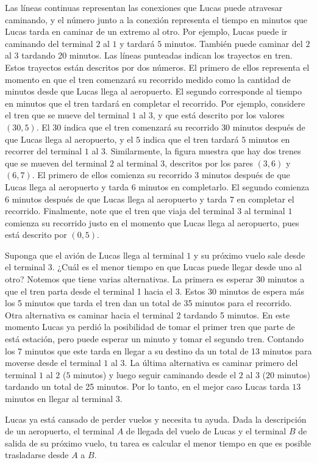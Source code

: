 \documentclass{oci}
\begin{document}
\begin{problemDescription}
  Las líneas continuas representan las conexiones que Lucas puede atravesar
  caminando, y el número junto a la conexión representa el tiempo en minutos que Lucas tarda
  en caminar de un extremo al otro. Por ejemplo, Lucas puede ir caminando del terminal $2$ al $1$
  y tardará $5$ minutos. También puede caminar del $2$ al $3$ tardando 20 minutos.
  Las líneas punteadas indican los trayectos en tren.
  Estos trayectos están descritos por dos números. El primero de ellos
  representa el momento en que el tren comenzará su recorrido 
  medido como la cantidad de minutos desde que Lucas llega al aeropuerto.
  El segundo corresponde al tiempo en minutos que el tren tardará en
  completar el recorrido.
  Por ejemplo, considere el tren que se mueve del terminal $1$ al $3$, y que está
  descrito por los valores $(30, 5)$. El $30$ indica que el tren comenzará su recorrido 
  $30$ minutos después de que Lucas llega al aeropuerto, y el $5$ indica que el tren tardará $5$ minutos
  en recorrer del terminal $1$ al $3$.
  Similarmente, la figura muestra que hay dos trenes que se mueven del terminal $2$ al terminal $3$, descritos por los pares $(3,6)$ y $(6,7)$.
  El primero de ellos comienza su recorrido $3$ minutos después de que Lucas llega al aeropuerto y tarda $6$ minutos en completarlo.
  El segundo comienza $6$ minutos después de que Lucas llega al aeropuerto y tarda $7$ en completar el recorrido.
  Finalmente, note que el tren que viaja del terminal 
  $3$ al terminal $1$ comienza su recorrido justo en el momento
  que Lucas llega al aeropuerto, pues está descrito por $(0,5)$.

  Suponga que el avión de Lucas llega al terminal $1$ y su próximo vuelo sale desde
  el terminal $3$. ¿Cuál es el menor tiempo en que Lucas puede llegar desde uno al otro?
  Notemos que tiene varias
  alternativas.
  La primera es esperar 30 minutos a que el tren parta desde el terminal 1 hacia
  el 3.
  Estos 30 minutos de espera más los 5 minutos que tarda el tren dan un total de
  35 minutos para el recorrido.
  Otra alternativa es caminar hacia el terminal 2 tardando 5 minutos.
  En este momento Lucas ya perdió la posibilidad de tomar el primer tren que
  parte de está estación, pero puede esperar un minuto y tomar el segundo tren.
  Contando los 7 minutos que este tarda en llegar a su destino da un total de 13
  minutos para moverse desde el terminal $1$ al $3$.
  La última alternativa es caminar primero del terminal $1$ al $2$ ($5$ minutos) 
  y luego seguir caminando desde el $2$ al $3$ ($20$ minutos) 
  tardando un total de 25 minutos.
  Por lo tanto, en el mejor caso Lucas tarda $13$ minutos en llegar al terminal $3$.

  Lucas ya está cansado de perder vuelos y necesita tu ayuda.
  Dada la descripción de un aeropuerto, el terminal $A$ de llegada del vuelo de Lucas y el terminal $B$
  de salida de su próximo vuelo, tu tarea es calcular el menor tiempo en que es posible
  trasladarse desde $A$ a $B$.
  

\end{problemDescription}
\end{document}
